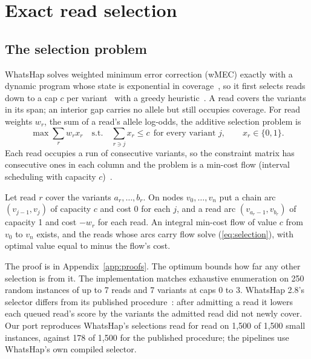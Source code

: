 
\section{Exact read selection}\label{sec:selection}

\subsection{The selection problem}\label{sec:selproblem}

WhatsHap solves weighted minimum error correction (wMEC) exactly with a
dynamic program whose state is exponential in coverage~\cite{patterson2015},
so it first selects reads down to a cap $c$ per variant~\cite{martin2016}
with a greedy heuristic~\cite{fischer2016}. A read covers the variants in its
span; an interior gap carries no allele but still occupies coverage. For read
weights $w_r$, the sum of a read's allele log-odds, the additive selection
problem is
\begin{equation}\label{eq:selection}
\max \sum_r w_r x_r \quad\text{s.t.}\quad \sum_{r\ni j}x_r\le c\ \
\text{for every variant } j,\qquad x_r\in\{0,1\}.
\end{equation}
Each read occupies a run of consecutive variants, so the constraint matrix
has consecutive ones in each column and the problem is a min-cost flow
(interval scheduling with capacity $c$)~\cite{arkin1987,carlisle1995}.

\begin{proposition}\label{prop:flow}
Let read $r$ cover the variants $a_r,\dots,b_r$. On nodes $v_0,\dots,v_n$
put a chain arc $(v_{j-1},v_j)$ of capacity $c$ and cost 0 for each $j$, and
a read arc $(v_{a_r-1},v_{b_r})$ of capacity 1 and cost $-w_r$ for each read.
An integral min-cost flow of value $c$ from $v_0$ to $v_n$ exists, and the
reads whose arcs carry flow solve (\ref{eq:selection}), with optimal value
equal to minus the flow's cost.
\end{proposition}

The proof is in Appendix~\ref{app:proofs}. The optimum bounds how far any
other selection is from it. The implementation matches exhaustive
enumeration on 250 random instances of up to 7 reads and 7 variants at caps
0 to 3. WhatsHap 2.8's selector differs from its published
procedure~\cite{fischer2016}: after admitting a read it lowers each queued
read's score by the variants the admitted read did not newly cover. Our port
reproduces WhatsHap's selections read for read on 1{,}500 of 1{,}500 small
instances, against 178 of 1{,}500 for the published procedure; the pipelines
use WhatsHap's own compiled selector.

